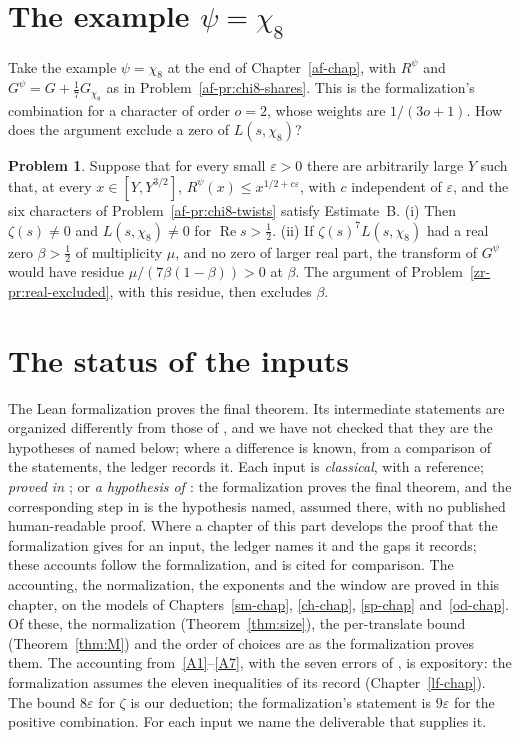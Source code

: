 \documentclass[reqno]{amsart}
\newcounter{chap}
\theoremstyle{definition}
\newtheorem{problem}{Problem}[section]
\theoremstyle{plain}
\renewcommand{\Re}{\operatorname{Re}}
\begin{document}
\section{The example \texorpdfstring{\(\psi = \chi_8\)}{psi = chi8}}\label{sec:chi8}

Take the example \(\psi = \chi_8\) at the end of Chapter~\ref{af-chap}, with \(R^\psi\) and \(G^\psi = G + \frac17G_{\chi_8}\) as in Problem~\ref{af-pr:chi8-shares}.  This is the formalization's combination for a character of order \(o = 2\), whose weights are \(1/(3o+1)\).  How does the argument exclude a zero of \(L(s, \chi_8)\)?

\begin{problem}\label{pr:chi8-zero}
Suppose that for every small \(\varepsilon > 0\) there are arbitrarily large \(Y\) such that, at every \(x \in [Y, Y^{3/2}]\), \(R^\psi(x) \le x^{1/2+c\varepsilon}\), with \(c\) independent of \(\varepsilon\), and the six characters of Problem~\ref{af-pr:chi8-twists} satisfy Estimate~B.
(i) Then \(\zeta(s) \ne 0\) and \(L(s, \chi_8) \ne 0\) for \(\Re s > \frac12\).
(ii) If \(\zeta(s)^7 L(s, \chi_8)\) had a real zero \(\beta > \frac12\) of multiplicity \(\mu\), and no zero of larger real part, the transform of \(G^\psi\) would have residue \(\mu/(7\beta(1 - \beta)) > 0\) at \(\beta\).  The argument of Problem~\ref{zr-pr:real-excluded}, with this residue, then excludes \(\beta\).
\end{problem}

\section{The status of the inputs}\label{sec:map}

The Lean formalization \cite{Lean} proves the final theorem.  Its intermediate statements are organized differently from those of \cite{Adr}, and we have not checked that they are the hypotheses of \cite{Adr} named below; where a difference is known, from a comparison of the statements, the ledger records it.  Each input is \emph{classical}, with a reference; \emph{proved in \cite{Adr}}; or \emph{a hypothesis of \cite{Adr}}: the formalization proves the final theorem, and the corresponding step in \cite{Adr} is the hypothesis named, assumed there, with no published human-readable proof.  Where a chapter of this part develops the proof that the formalization gives for an input, the ledger names it and the gaps it records; these accounts follow the formalization, and \cite{Adr} is cited for comparison.  The accounting, the normalization, the exponents and the window are proved in this chapter, on the models of Chapters~\ref{sm-chap}, \ref{ch-chap}, \ref{sp-chap} and~\ref{od-chap}.  Of these, the normalization (Theorem~\ref{thm:size}), the per-translate bound (Theorem~\ref{thm:M}) and the order of choices are as the formalization proves them.  The accounting from~\eqref{A1}--\eqref{A7}, with the seven errors of \cite{Adr}, is expository: the formalization assumes the eleven inequalities of its record (Chapter~\ref{lf-chap}).  The bound \(8\varepsilon\) for \(\zeta\) is our deduction; the formalization's statement is \(9\varepsilon\) for the positive combination.  For each input we name the deliverable that supplies it.
\end{document}
